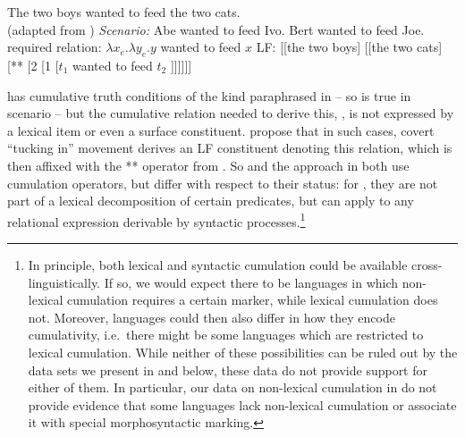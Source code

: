 \documentclass[output=paper]{langscibook}
\begin{document}
\ea\label{has-sch:7}
\ea\label{has-sch:7a} The two boys wanted to feed the two cats. \\  \hfill (adapted from \citealt{Beck:2000a}) \label{has-sch:3a}
\ex\label{has-sch:7b} \textit{Scenario:} Abe wanted to feed Ivo. Bert wanted to feed Joe. \label{has-sch:3b}
\ex\label{has-sch:7c} required relation: $\lambda x_{e}. \lambda y_{e}. y$ wanted to feed $x$
\ex\label{has-sch:7d} LF: [[the two boys] [[the two cats] [** [2 [1 [$t_{1}$ wanted to feed $t_{2}$ ]]]]]] \z\z

\noindent {} has cumulative truth conditions of the kind paraphrased in  --   so  is true in scenario  -- but the cumulative relation needed to derive this, , is not expressed by a lexical item or even a surface constituent. \citet{Beck:2000a} propose that in such cases, covert ``tucking in''  movement derives an LF constituent denoting this relation, which is then affixed with the ** operator from . So \citet{Beck:2000a} and the approach in  both use cumulation operators, but differ with respect to their status: for \citet{Beck:2000a}, they are not part of a lexical decomposition of certain predicates, but can apply to any relational expression derivable by syntactic processes.\footnote{In principle, both lexical and syntactic cumulation could be available cross-linguistically. If so, we would expect there to be languages in which non-lexical cumulation requires a certain marker, while lexical cumulation does not. Moreover,
languages could then also differ in how they encode cumulativity, i.e.~there might be some languages which are restricted to lexical cumulation.  While neither of these possibilities can be  ruled out by the data sets we present in  and  below, these data do not provide support for either of them. In particular, our  data on non-lexical cumulation  in   do not provide evidence that some languages lack non-lexical cumulation or associate it with special morphosyntactic marking.}
\end{document}
